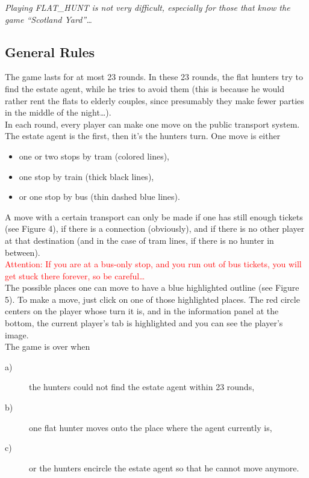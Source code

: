 \emph{Playing FLAT\_HUNT is not very difficult, especially for those that know the game ``Scotland Yard''\ldots}\\

\subsection{General Rules}

 The game lasts for at most 23 rounds. In these 23 rounds, the flat hunters try to find the estate agent, while he tries to avoid them (this is because he would rather rent the flats to elderly couples, since presumably they make fewer parties in the middle of the night\ldots).\\

In each round, every player can make one move on the public transport system. The estate agent is the first, then it's the hunters turn. One move is either 

\begin{itemize}
  \item  one or two stops by tram (colored lines),
  \item  one stop by train (thick black lines),
  \item  or one stop by bus (thin dashed blue lines).
\end{itemize}

 A move with a certain transport can only be made if one has still enough tickets (see Figure 4), if there is a connection (obviously), and if there is no other player at that destination (and in the case of tram lines, if there is no hunter in between).\\

 \textcolor{red}{Attention: If you are at a bus-only stop, and you run out of bus tickets, you will get stuck there forever, so be careful\ldots}\\

 The possible places one can move to have a blue highlighted outline (see Figure 5). To make a move, just click on one of those highlighted places. The red circle centers on the player whose turn it is, and in the information panel at the bottom, the current player's tab is highlighted and you can see the player's image.\\

The game is over when

  \begin{description}
    \item[a)]the hunters could not find the estate agent within 23 rounds,
    \item[b)]one flat hunter moves onto the place where the agent currently is,
    \item[c)]or the hunters encircle the estate agent so that he cannot move anymore.
  \end{description}

